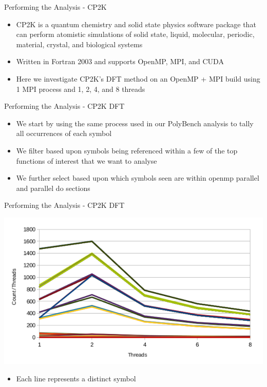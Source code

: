 \documentclass[final]{beamer}
\let\olditem\item
\renewcommand{\item}{\vspace{\fill}\olditem}
\begin{document}
\begin{frame}{\hspace{0.02\paperwidth}Performing the Analysis - CP2K}
\begin{itemize}
\item CP2K is a quantum chemistry and solid state physics software package that can perform atomistic simulations of solid state, liquid, molecular, periodic, material, crystal, and biological systems
\item Written in Fortran 2003 and supports OpenMP, \acs{MPI}, and CUDA
\item Here we investigate CP2K's \ac{DFT} method on an OpenMP + \acs{MPI} build using 1 \acs{MPI} process and 1, 2, 4, and 8 threads
\end{itemize}
\end{frame}

\begin{frame}{\hspace{0.02\paperwidth}Performing the Analysis - CP2K DFT}
\begin{itemize}
\item We start by using the same process used in our PolyBench analysis to tally all occurrences of each symbol
\item We filter based upon symbols being referenced within a few of the top functions of interest that we want to analyse
\item We further select based upon which symbols seen are within openmp parallel and parallel do sections
\end{itemize}
\end{frame}

\begin{frame}{\hspace{0.02\paperwidth}Performing the Analysis - CP2K DFT}
\begin{center}
\includegraphics{images/cp2k-omp-counts.pdf}
\end{center}
\begin{itemize}
\item Each line represents a distinct symbol
\end{itemize}
\end{frame}
\end{document}

